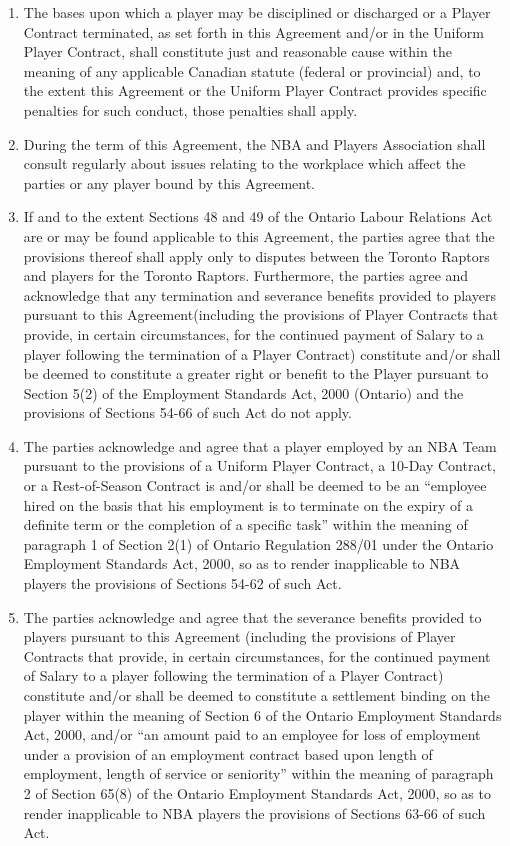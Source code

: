 \documentclass[
]{book}
\providecommand{\tightlist}{%
  \setlength{\itemsep}{0pt}\setlength{\parskip}{0pt}}
\begin{document}
\begin{enumerate}
\def\labelenumi{(\alph{enumi})}
\tightlist
\item
  The bases upon which a player may be disciplined or discharged or a Player Contract terminated, as set forth in this Agreement and/or in the Uniform Player Contract, shall constitute just and reasonable cause within the meaning of any applicable Canadian statute (federal or provincial) and, to the extent this Agreement or the Uniform Player Contract provides specific penalties for such conduct, those penalties shall apply.
\item
  During the term of this Agreement, the NBA and Players Association shall consult regularly about issues relating to the workplace which affect the parties or any player bound by this Agreement.
\item
  If and to the extent Sections 48 and 49 of the Ontario Labour Relations Act are or may be found applicable to this Agreement, the parties agree that the provisions thereof shall apply only to disputes between the Toronto Raptors and players for the Toronto Raptors. Furthermore, the parties agree and acknowledge that any termination and severance benefits provided to players pursuant to this Agreement(including the provisions of Player Contracts that provide, in certain circumstances, for the continued payment of Salary to a player following the termination of a Player Contract) constitute and/or shall be deemed to constitute a greater right or benefit to the Player pursuant to Section 5(2) of the Employment Standards Act, 2000 (Ontario) and the provisions of Sections 54-66 of such Act do not apply.
\item
  The parties acknowledge and agree that a player employed by an NBA Team pursuant to the provisions of a Uniform Player Contract, a 10-Day Contract, or a Rest-of-Season Contract is and/or shall be deemed to be an ``employee hired on the basis that his employment is to terminate on the expiry of a definite term or the completion of a specific task'' within the meaning of paragraph 1 of Section 2(1) of Ontario Regulation 288/01 under the Ontario Employment Standards Act, 2000, so as to render inapplicable to NBA players the provisions of Sections 54-62 of such Act.
\item
  The parties acknowledge and agree that the severance benefits provided to players pursuant to this Agreement (including the provisions of Player Contracts that provide, in certain circumstances, for the continued payment of Salary to a player following the termination of a Player Contract) constitute and/or shall be deemed to constitute a settlement binding on the player within the meaning of Section 6 of the Ontario Employment Standards Act, 2000, and/or ``an amount paid to an employee for loss of employment under a provision of an employment contract based upon length of employment, length of service or seniority'' within the meaning of paragraph 2 of Section 65(8) of the Ontario Employment Standards Act, 2000, so as to render inapplicable to NBA players the provisions of Sections 63-66 of such Act.

\end{enumerate}
\end{document}
